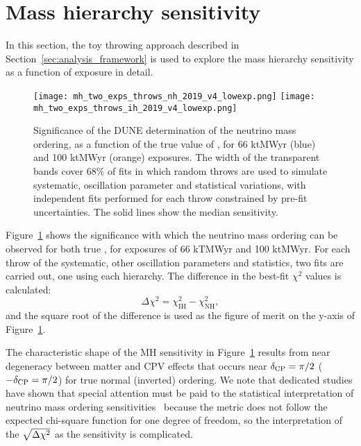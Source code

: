 \section{Mass hierarchy sensitivity}
\label{sec:mh_sens}

In this section, the toy throwing approach described in Section~\ref{sec:analysis_framework} is used to explore the mass hierarchy sensitivity as a function of exposure in detail.

\begin{figure}[htbp]
  \centering
  \texttt{[image: mh\_two\_exps\_throws\_nh\_2019\_v4\_lowexp.png]}
  \texttt{[image: mh\_two\_exps\_throws\_ih\_2019\_v4\_lowexp.png]}
  \caption{Significance of the DUNE determination of the neutrino mass ordering, as a function of the true value of \deltacp, for 66 ktMWyr (blue) and 100 ktMWyr (orange) exposures. The width of the transparent bands cover 68\% of fits in which random throws are used to simulate systematic, oscillation parameter and statistical variations, with independent fits performed for each throw constrained by pre-fit uncertainties. The solid lines show the median sensitivity.}
  \label{fig:mh_bands}
\end{figure}
Figure~\ref{fig:mh_bands} shows the significance with which the neutrino mass ordering can be observed for both true  , for exposures of 66 kTMWyr and 100 ktMWyr. For each throw of the systematic, other oscillation parameters and statistics, two fits are carried out, one using each hierarchy. The difference in the best-fit $\chi^{2}$ values is calculated:
\begin{equation}
  \Delta\chi^{2} = \chi^{2}_{\mathrm{IH}} - \chi^{2}_{\mathrm{NH}},
  \label{eq:mh_chi2}
\end{equation}
\noindent and the square root of the difference is used as the figure of merit on the y-axis of Figure~\ref{fig:mh_bands}.

The characteristic shape of the MH sensitivity in Figure~\ref{fig:mh_bands} results from near degeneracy between matter and CPV effects that occurs near $\delta_{\rm CP}=\pi/2$ ($-\delta_{\rm CP}=\pi/2$) for true normal (inverted) ordering. We note that dedicated studies have shown that special attention must be paid to the statistical interpretation of neutrino mass ordering sensitivities~\cite{Ciuffoli:2013rza,Qian:2012zn,Blennow:2013oma} because the \dchisq metric does not follow the expected chi-square function for one degree of freedom, so the interpretation of the $\sqrt{\Delta\chi^{2}}$ as the sensitivity is complicated.

